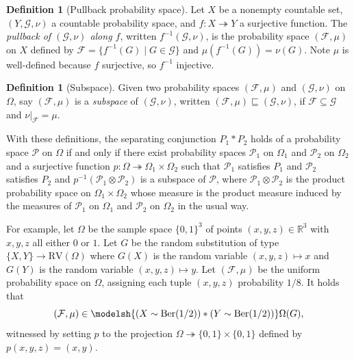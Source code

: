 \documentclass[
  sigconf,
  screen, ]{acmart}
\theoremstyle{definition}
\newtheorem{definition}[theorem]{Definition}
\newcommand\calF{\mathcal F}
\newcommand\calG{\mathcal G}
\newcommand\calP{\mathcal P}
\newcommand\R{\mathbb R}
\newcommand\Ber{\operatorname{Ber}}
\newcommand\nref[2]{\hyperref[#1]{#2}} \newcommand\checkhigh{{\huge{\color{red}\textbf{TODO: check}}}}
\newcommand\sepcon{\mathbin{*}}
\newcommand\DRVprelim{{\nref{def:DRVprelim}{\mathrm{RV}}}}
\begin{document}
\begin{definition}[Pullback probability space]
  Let $X$ be a nonempty countable set, $(Y,\calG,\nu)$
  a countable probability space,
  and $f : X\twoheadrightarrow Y$
  a surjective function.
  The \emph{pullback of $(\calG,\nu)$ along $f$},
  written $f^{-1}(\calG,\nu)$,
  is the probability space $(\calF,\mu)$ on $X$ 
  defined by
  $\calF = \{f^{-1}(G) \mid G \in\calG\}$
  and $\mu(f^{-1}(G)) = \nu(G)$.
  Note $\mu$ is well-defined because
  $f$ surjective, so $f^{-1}$ injective.
\end{definition}

\newcommand\subpspcs{\mathrel{\nref{def:subpspcs}{\sqsubseteq}}}
\begin{definition}[Subspace] \label{def:subpspcs}
  Given two probability spaces $(\calF,\mu)$
  and $(\calG,\nu)$ on $\Omega$,
  say $(\calF,\mu)$ is a \emph{subspace} of $(\calG,\nu)$,
  written $(\calF,\mu)\subpspcs(\calG,\nu)$,
  if $\calF\subseteq\calG$ and $\nu|_\calF = \mu$.\end{definition}

With these definitions, the separating conjunction $P_1\sepcon P_2$
holds of a probability space $\calP$
on $\Omega$
if and only if there exist probability spaces $\calP_1$ on $\Omega_1$
and $\calP_2$ on $\Omega_2$
and a surjective function
$p : \Omega\twoheadrightarrow\Omega_1\times\Omega_2$
such that $\calP_1$ satisfies $P_1$
and $\calP_2$ satisfies $P_2$
and $p^{-1}(\calP_1\otimes\calP_2)$
is a subspace of $\calP$,
where $\calP_1\otimes\calP_2$
is the product probability space
on $\Omega_1\times\Omega_2$
whose measure is the product measure
induced by the measures of $\calP_1$ on $\Omega_1$
and $\calP_2$ on $\Omega_2$ in the usual way.

For example, let $\Omega$ be the sample space $\{0,1\}^3$
of points $(x,y,z)\in\R^3$ with $x,y,z$ all either $0$ or $1$.
Let $G$ be the random substitution of type $\{X,Y\}\to\DRVprelim(\Omega)$
where $G(X)$ is the random variable $(x,y,z)\mapsto x$
and $G(Y)$ is the random variable $(x,y,z)\mapsto y$.
Let $(\calF,\mu)$ be the uniform probability space on $\Omega$,
assigning each tuple $(x,y,z)$ probability $1/8$.
It holds that
\[
  (\calF,\mu)\in\modelsh{(X\sim\Ber(1/2))\sepcon(Y\sim\Ber(1/2))}\Omega(G),
\]
witnessed by setting $p$
to the projection $\Omega\twoheadrightarrow\{0,1\}\times\{0,1\}$
defined by $p(x,y,z) = (x,y)$.
\end{document}
